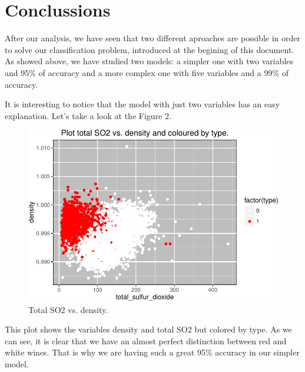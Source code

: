 \documentclass[12pt,]{article}
\begin{document}
\section{Conclussions}\label{conclussions}

After our analysis, we have seen that two different aproaches are
possible in order to solve our classification problem, introduced at the
begining of this document. As showed above, we have studied two models:
a simpler one with two variables and 95\% of accuracy and a more complex
one with five variables and a 99\% of accuracy.

It is interesting to notice that the model with just two variables has
an easy explanation. Let's take a look at the Figure 2.

\begin{figure}[h]

{\centering \includegraphics{logistic-regression_files/figure-latex/two_variables_plot-1} 

}

\caption{Total SO2 vs. density.}\label{fig:two_variables_plot}
\end{figure}

This plot shows the variables density and total SO2 but colored by type.
As we can see, it is clear that we have an almost perfect distinction
between red and white wines. That is why we are having such a great 95\%
accuracy in our simpler model.
\end{document}

